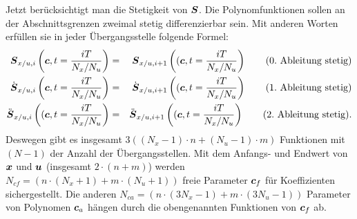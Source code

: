 Jetzt berücksichtigt man die Stetigkeit von $\boldsymbol S$. Die Polynomfunktionen sollen an der Abschnittsgrenzen zweimal stetig differenzierbar sein. Mit anderen Worten erfüllen sie in jeder Übergangsstelle folgende Formel:
\begin{eqnarray}
\boldsymbol S_{x/u,i}\left(\boldsymbol c,t = \frac{iT}{N_{x}/N_{u}}\right ) &=& \boldsymbol S_{x/u,i+1}\left((\boldsymbol c,t = \frac{iT}{N_{x}/N_{u}}\right )~~~~~~\text{(0.~Ableitung~stetig)}\notag\\
\dot{\boldsymbol S}_{x/u,i}\left(\boldsymbol c,t = \frac{iT}{N_{x}/N_{u}}\right ) &=& \dot{\boldsymbol S}_{x/u,i+1}\left((\boldsymbol c,t = \frac{iT}{N_{x}/N_{u}}\right )~~~~~~\text{(1.~Ableitung~stetig)}\notag\\
\ddot{\boldsymbol S}_{x/u,i}\left((\boldsymbol c,t = \frac{iT}{N_{x}/N_{u}}\right ) &=& \ddot{\boldsymbol S}_{x/u,i+1}\left((\boldsymbol c,t = \frac{iT}{N_{x}/N_{u}}\right )~~~~~~\text{(2.~Ableitung~stetig)}.\notag\\
\end{eqnarray}
Deswegen gibt es insgesamt $3((N_{x}-1)\cdot n + (N_{u}-1)\cdot m)$ Funktionen mit $(N-1)$ der Anzahl der Übergangsstellen. Mit dem Anfangs- und Endwert von $\boldsymbol x$ und $\boldsymbol u$ (insgesamt $2\cdot (n+m)$) werden $N_{cf} = (n\cdot (N_{x}+1) + m \cdot (N_{u}+1))$ freie Parameter $\boldsymbol c_{f}$ für Koeffizienten sichergestellt. Die anderen $N_{ca} = (n\cdot (3N_{x}-1) + m\cdot (3N_{u}-1))$ Parameter von Polynomen $\boldsymbol c_{a}$ hängen durch die obengenannten Funktionen von $\boldsymbol c_{f}$ ab.

